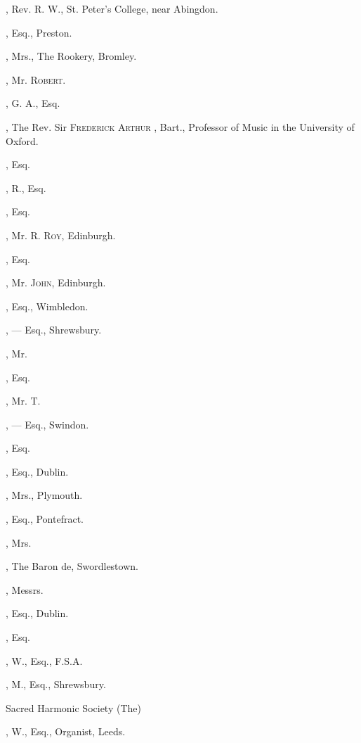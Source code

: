 \begin{multicols}{2}
, Rev. R. W., St. Peter’s College,
near Abingdon.

, Esq., Preston.

, Mrs., The Rookery, Bromley.
\bigskip

, Mr. \textsc{Robert}.

, G. A., Esq.

, The Rev. Sir \textsc{Frederick Arthur}
, Bart., Professor of Music in the
University of Oxford.

, Esq.
\bigskip

, R., Esq.

, Esq.

, Mr. R. \textsc{Roy}, Edinburgh.

, Esq.

, Mr. \textsc{John}, Edinburgh.

, Esq., Wimbledon.
\bigskip

, — Esq., Shrewsbury.

, Mr.

, Esq.

, Mr. T.

, — Esq., Swindon.

, Esq.

, Esq., Dublin.

, Mrs., Plymouth.

, Esq., Pontefract.

, Mrs.

, The Baron de, Swordlestown.

, Messrs.
\bigskip

, Esq., Dublin.

, Esq.

, W., Esq., F.S.A.

, M., Esq., Shrewsbury.

Sacred Harmonic Society (The)

, W., Esq., Organist, Leeds.


\end{multicols}
